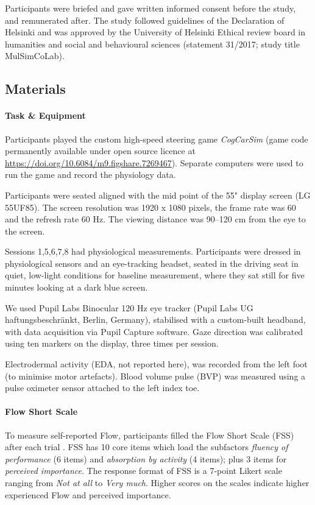 \documentclass[10pt,letterpaper,floatsintext]{article}
\begin{document}
Participants were briefed and gave written informed consent before the study, and remunerated after. The study followed guidelines of the Declaration of Helsinki and was approved by the University of Helsinki Ethical review board in humanities and social and behavioural sciences (statement 31/2017; study title MulSimCoLab).

\subsection*{Materials}
\paragraph{Task \& Equipment} Participants played the custom high-speed steering game {\it CogCarSim} (game code permanently available under open source licence at \url{https://doi.org/10.6084/m9.figshare.7269467}). Separate computers were used to run the game and record the physiology data.

Participants were seated aligned with the mid point of the 55" display screen (LG 55UF85). The screen resolution was 1920 x 1080 pixels, the frame rate was 60 and the refresh rate 60 Hz. The viewing distance was 90--120 cm from the eye to the screen.

Sessions 1,5,6,7,8 had physiological measurements. Participants were dressed in physiological sensors and an eye-tracking headset, seated in the driving seat in quiet, low-light conditions for baseline measurement, where they sat still for five minutes looking at a dark blue screen.

We used Pupil Labs Binocular 120 Hz eye tracker (Pupil Labs UG haftungsbeschränkt, Berlin, Germany), stabilised with a custom-built headband, with data acquisition via Pupil Capture software. Gaze direction was calibrated using ten markers on the display, three times per session.

Electrodermal activity (EDA, not reported here),  was recorded from the left foot (to minimise motor artefacts). Blood volume pulse (BVP) was measured using a pulse oximeter sensor attached to the left index toe.

\paragraph{Flow Short Scale} To measure self-reported Flow, participants filled the Flow Short Scale (FSS) after each trial \cite{Rheinberg2003,Engeser2008}. FSS has 10 core items which load the subfactors {\it fluency of performance} (6 items) and {\it absorption by activity} (4 items); plus 3 items for {\it perceived importance}. The response format of FSS is a 7-point Likert scale ranging from {\it Not at all} to {\it Very much}. Higher scores on the scales indicate higher experienced Flow and perceived importance.
\end{document}
